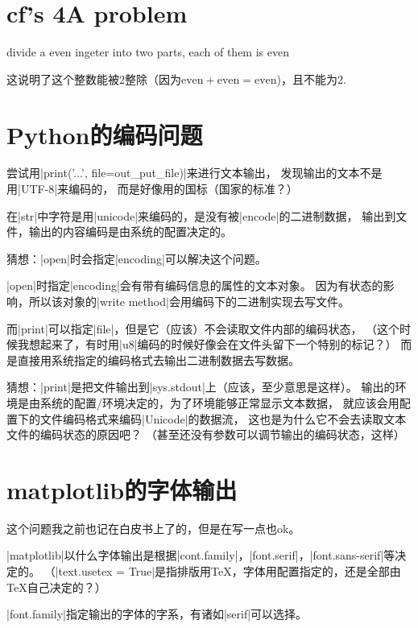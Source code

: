 \section{cf's 4A problem}

divide a even ingeter into two parts, each of them is even

这说明了这个整数能被2整除（因为$\text{even}+\text{even}=\text{even}$)，且不能为2.


\section{Python的编码问题}

尝试用\vb|print('...', file=out\_put\_file)|来进行文本输出，
发现输出的文本不是用\vb|UTF-8|来编码的，
而是好像用的国标（国家的标准？）

在\vb|str|中字符是用\vb|unicode|来编码的，是没有被\vb|encode|的二进制数据，
输出到文件，输出的内容编码是由系统的配置决定的。

猜想：\vb|open|时会指定\vb|encoding|可以解决这个问题。

\vb|open|时指定\vb|encoding|会有带有编码信息的属性的文本对象。
因为有状态的影响，所以该对象的\vb|write method|会用编码下的二进制实现去写文件。

而\vb|print|可以指定\vb|file|，但是它（应该）不会读取文件内部的编码状态，
（这个时候我想起来了，有时用\vb|u8|编码的时候好像会在文件头留下一个特别的标记？）
而是直接用系统指定的编码格式去输出二进制数据去写数据。

猜想：\vb|print|是把文件输出到\vb|sys.stdout|上（应该，至少意思是这样）。
输出的环境是由系统的配置/环境决定的，为了环境能够正常显示文本数据，
就应该会用配置下的文件编码格式来编码\vb|Unicode|的数据流，
这也是为什么它不会去读取文本文件的编码状态的原因吧？
（甚至还没有参数可以调节输出的编码状态，这样）


\section{matplotlib的字体输出}

这个问题我之前也记在白皮书上了的，但是在写一点也ok。

\vb|matplotlib|以什么字体输出是根据\vb|cont.family|，\vb|font.serif|，\vb|font.sans-serif|等决定的。
（\vb|text.usetex = True|是指排版用\TeX ，字体用配置指定的，还是全部由\TeX 自己决定的？）

\vb|font.family|指定输出的字体的字系，有诸如\vb|serif|可以选择。

